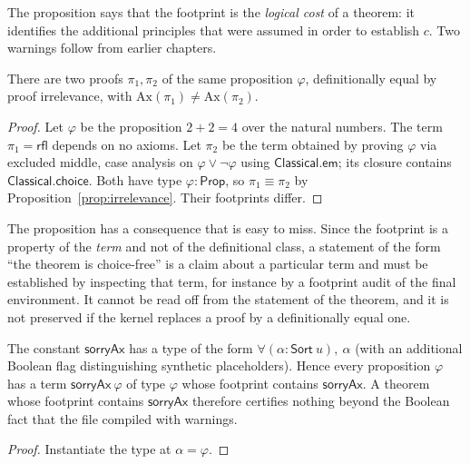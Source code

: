 The proposition says that the footprint is the \emph{logical cost} of a theorem: it identifies the additional principles that were assumed in order to establish $c$. Two warnings follow from earlier chapters.

\begin{proposition}
\label{prop:footprint-not-invariant}
There are two proofs $\pi_1,\pi_2$ of the same proposition $\varphi$, definitionally equal by proof irrelevance, with $\mathrm{Ax}(\pi_1)\ne\mathrm{Ax}(\pi_2)$.
\end{proposition}

\begin{proof}
Let $\varphi$ be the proposition $2+2=4$ over the natural numbers. The term $\pi_1=\mathsf{rfl}$ depends on no axioms. Let $\pi_2$ be the term obtained by proving $\varphi$ via excluded middle, case analysis on $\varphi\vee\neg\varphi$ using $\mathsf{Classical.em}$; its closure contains $\mathsf{Classical.choice}$. Both have type $\varphi:\mathsf{Prop}$, so $\pi_1\equiv\pi_2$ by Proposition~\ref{prop:irrelevance}. Their footprints differ.
\end{proof}

The proposition has a consequence that is easy to miss. Since the footprint is a property of the \emph{term} and not of the definitional class, a statement of the form ``the theorem is choice-free'' is a claim about a particular term and must be established by inspecting that term, for instance by a footprint audit of the final environment. It cannot be read off from the statement of the theorem, and it is not preserved if the kernel replaces a proof by a definitionally equal one.

\begin{proposition}
\label{prop:sorry}
The constant $\mathsf{sorryAx}$ has a type of the form $\forall(\alpha:\mathsf{Sort}\ u),\ \alpha$ (with an additional Boolean flag distinguishing synthetic placeholders). Hence every proposition $\varphi$ has a term $\mathsf{sorryAx}\ \varphi$ of type $\varphi$ whose footprint contains $\mathsf{sorryAx}$. A theorem whose footprint contains $\mathsf{sorryAx}$ therefore certifies nothing beyond the Boolean fact that the file compiled with warnings.
\end{proposition}

\begin{proof}
Instantiate the type at $\alpha=\varphi$.
\end{proof}

